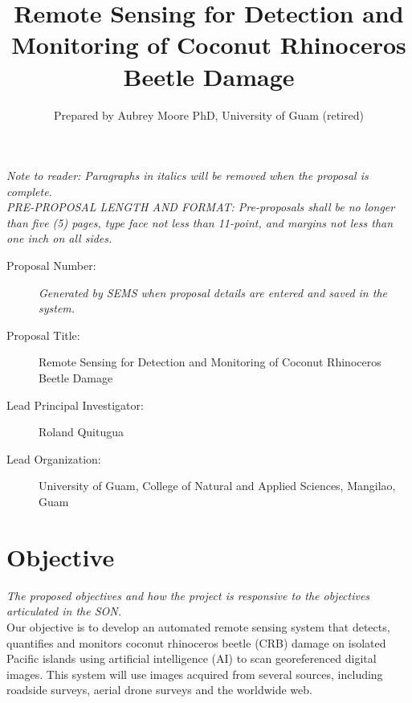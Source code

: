 \documentclass[11pt,english,letterpaper]{scrartcl}
\begin{document}
\titlehead{DRAFT SERDP FY25 PREPROPOSAL}
\title{Remote Sensing for Detection and Monitoring of Coconut Rhinoceros Beetle Damage}
\author{Prepared by Aubrey Moore PhD, University of Guam (retired)}

\maketitle

\tableofcontents{}\clearpage{}

\textit{Note to reader: Paragraphs in italics will be removed when the proposal is complete.} \\

\textit{PRE-PROPOSAL LENGTH AND FORMAT: 
Pre-proposals shall be no longer than five (5) pages, type face not less than 11-point, and margins
not less than one inch on all sides.} 

\begin{description}
	
\item[Proposal Number:] \emph{Generated by SEMS when proposal details are entered and saved in the system.}

\item[Proposal Title:] Remote Sensing for Detection and Monitoring of Coconut Rhinoceros Beetle Damage

\item[Lead Principal Investigator:] Roland Quitugua

\item[Lead Organization:] University of Guam, College of Natural and Applied Sciences, Mangilao, Guam

\end{description}

\section{Objective}

\textit{The proposed objectives and how the project is responsive to the objectives
	articulated in the SON.}\\
	
Our objective is to develop an automated remote sensing system that detects, quantifies and monitors coconut rhinoceros beetle (CRB) damage on isolated Pacific islands using artificial intelligence (AI) to scan georeferenced digital images. This system will use images acquired from several sources, including roadside surveys, aerial drone surveys and the worldwide web.
\end{document}
